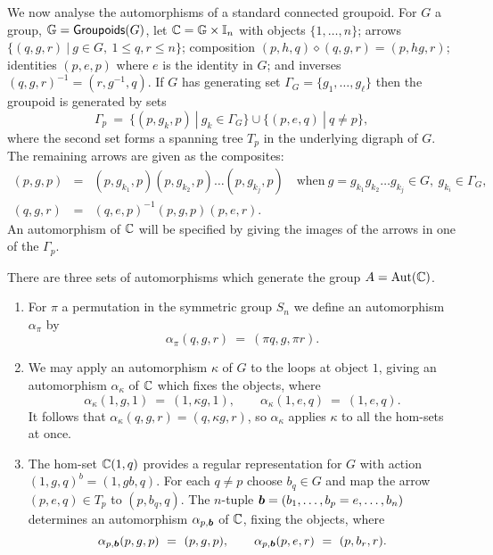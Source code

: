 \bigskip
We now analyse the automorphisms of a standard connected groupoid. 
For $G$ a group, $\mathbb{G} = {\sf Groupoids}(G)$, 
let $\mathbb{C} = \mathbb{G} \times \mathbb{I}_n$ with objects $\{1,\ldots,n\}$; 
arrows $\{(q,g,r) ~|~ g \in G,~ 1 \leqslant q,r \leqslant n\}$; 
composition $(p,h,q)\diamond(q,g,r) = (p,hg,r)$; 
identities $(p,e,p)$ where $e$ is the identity in $G$; 
and inverses $(q,g,r)^{-1} = (r,g^{-1},q)$. 
If $G$ has generating set $\Gamma_G = \{g_1,\ldots,g_{\ell}\}$ 
then the groupoid is generated by sets  
$$
\Gamma_p ~=~ \{(p,g_k,p) ~|~ g_k \in \Gamma_G\} \cup 
             \{(p,e,q) ~|~ q \neq p\}, 
$$
where the second set forms a spanning tree $T_p$ in the underlying 
digraph of $G$. 
The remaining arrows are given as the composites: 
\begin{eqnarray*}
(p,g,p) &=& (p,g_{k_1},p)(p,g_{k_2},p)\ldots(p,g_{k_j},p) \quad\text{when}~ 
             g = g_{k_1}g_{k_2}\ldots g_{k_j} \in G,~ g_{k_i} \in \Gamma_G, \\
(q,g,r) &=& (q,e,p)^{-1}(p,g,p)(p,e,r).
\end{eqnarray*}
An automorphism of $\mathbb{C}$ will be specified by giving the images 
of the arrows in one of the $\Gamma_p$. 

\medskip
There are three sets of automorphisms which generate the group 
$A = \mathrm{Aut}(\mathbb{C})$. 
\begin{enumerate}[(1)] 
\item
For $\pi$ a permutation in the symmetric group $S_n$ 
we define an automorphism $\alpha_{\pi}$ by 
$$
\alpha_{\pi}(q,g,r) ~=~ (\pi q, g,\pi r).
$$

\item
We may apply an automorphism $\kappa$ of $G$ to the loops at object $1$, 
giving an automorphism $\alpha_{\kappa}$ of $\mathbb{C}$ 
which fixes the objects, where 
$$
\alpha_{\kappa}(1,g,1) ~=~ (1,\kappa g,1), \qquad 
\alpha_{\kappa}(1,e,q) ~=~ (1,e,q).
$$ 
It follows that $\alpha_{\kappa}(q,g,r) = (q,\kappa g,r)$, 
so $\alpha_{\kappa}$ applies $\kappa$ to all the hom-sets at once. 

\item
The hom-set $\mathbb{C}(1,q)$ provides a regular representation for $G$ 
with action $(1,g,q)^b = (1,gb,q)$. 
For each $q \neq p$ choose $b_q \in G$ and map the arrow $(p,e,q) \in T_p$ 
to $(p,b_q,q)$. 
The $n$-tuple $\boldsymbol{b} = (b_1,\ldots,b_p=e,\ldots,b_n)$ determines an 
automorphism $\alpha_{p,\boldsymbol{b}}$ of $\mathbb{C}$, fixing the objects, where 
$$
\alpha_{p,\boldsymbol{b}}(p,g,p) ~=~ (p,g,p), \qquad 
\alpha_{p,\boldsymbol{b}}(p,e,r) ~=~ (p,b_r,r). 
$$
\end{enumerate}

